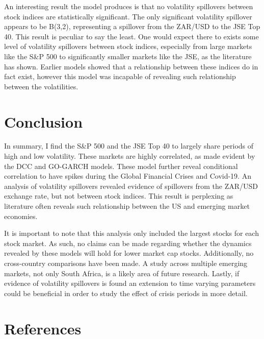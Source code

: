 \documentclass[11pt,preprint, authoryear]{elsarticle}
\numberwithin{equation}{section}
\numberwithin{figure}{section}
\numberwithin{table}{section}
\begin{document}
An interesting result the model produces is that no volatility
spillovers between stock indices are statistically significant. The only
significant volatility spillover appears to be B(3,2), representing a
spillover from the ZAR/USD to the JSE Top 40. This result is peculiar to
say the least. One would expect there to exists some level of volatility
spillovers between stock indices, especially from large markets like the
S\&P 500 to significantly smaller markets like the JSE, as the
literature has shown. Earlier models showed that a relationship between
these indices do in fact exist, however this model was incapable of
revealing such relationship between the volatilities.

\hypertarget{conclusion}{%
\section{Conclusion}\label{conclusion}}

In summary, I find the S\&P 500 and the JSE Top 40 to largely share
periods of high and low volatility. These markets are highly correlated,
as made evident by the DCC and GO-GARCH models. These model further
reveal conditional correlation to have spikes during the Global
Financial Crises and Covid-19. An analysis of volatility spillovers
revealed evidence of spillovers from the ZAR/USD exchange rate, but not
between stock indices. This result is perplexing as literature often
reveals such relationship between the US and emerging market economies.

It is important to note that this analysis only included the largest
stocks for each stock market. As such, no claims can be made regarding
whether the dynamics revealed by these models will hold for lower market
cap stocks. Additionally, no cross-country comparisons have been made. A
study across multiple emerging markets, not only South Africa, is a
likely area of future research. Lastly, if evidence of volatility
spillovers is found an extension to time varying parameters could be
beneficial in order to study the effect of crisis periods in more
detail.

\newpage

\hypertarget{references}{%
\section*{References}\label{references}}
\end{document}
